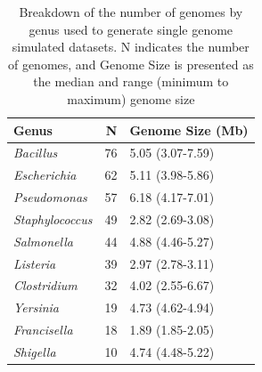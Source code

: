 \documentclass[fleqn,10pt,lineno]{wlpeerj}\usepackage[]{graphicx}\usepackage[]{color}
\begin{document}
\begin{table}[ht]
\centering
\begin{tabular}{lrl}
  \hline
Genus & N & Genome Size (Mb) \\ 
  \hline
\textit{Bacillus} &  76 & 5.05 (3.07-7.59) \\ 
  \textit{Escherichia} &  62 & 5.11 (3.98-5.86) \\ 
  \textit{Pseudomonas} &  57 & 6.18 (4.17-7.01) \\ 
  \textit{Staphylococcus} &  49 & 2.82 (2.69-3.08) \\ 
  \textit{Salmonella} &  44 & 4.88 (4.46-5.27) \\ 
  \textit{Listeria} &  39 & 2.97 (2.78-3.11) \\ 
  \textit{Clostridium} &  32 & 4.02 (2.55-6.67) \\ 
  \textit{Yersinia} &  19 & 4.73 (4.62-4.94) \\ 
  \textit{Francisella} &  18 & 1.89 (1.85-2.05) \\ 
  \textit{Shigella} &  10 & 4.74 (4.48-5.22) \\ 
   \hline
\end{tabular}
\caption{Breakdown of the number of genomes by genus used to generate single genome simulated datasets. N indicates the number of genomes, and Genome Size is presented as the median and range (minimum to maximum) genome size} 
\label{tab:single_org}
\end{table}
\end{document}
